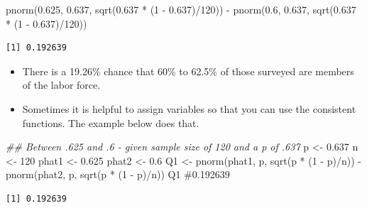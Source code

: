 \documentclass[
  letterpaper,
  DIV=11,
  numbers=noendperiod]{scrreprt}
\newenvironment{Shaded}{\begin{snugshade}}{\end{snugshade}}
\newcommand{\CommentTok}[1]{\textcolor[rgb]{0.37,0.37,0.37}{#1}}
\newcommand{\DecValTok}[1]{\textcolor[rgb]{0.68,0.00,0.00}{#1}}
\newcommand{\DocumentationTok}[1]{\textcolor[rgb]{0.37,0.37,0.37}{\textit{#1}}}
\newcommand{\FloatTok}[1]{\textcolor[rgb]{0.68,0.00,0.00}{#1}}
\newcommand{\FunctionTok}[1]{\textcolor[rgb]{0.28,0.35,0.67}{#1}}
\newcommand{\NormalTok}[1]{\textcolor[rgb]{0.00,0.23,0.31}{#1}}
\newcommand{\OtherTok}[1]{\textcolor[rgb]{0.00,0.23,0.31}{#1}}
\newcommand{\SpecialCharTok}[1]{\textcolor[rgb]{0.37,0.37,0.37}{#1}}
\begin{document}
\begin{Shaded}
\begin{Highlighting}[]
\FunctionTok{pnorm}\NormalTok{(}\FloatTok{0.625}\NormalTok{, }\FloatTok{0.637}\NormalTok{, }\FunctionTok{sqrt}\NormalTok{(}\FloatTok{0.637} \SpecialCharTok{*}\NormalTok{ (}\DecValTok{1} \SpecialCharTok{{-}} \FloatTok{0.637}\NormalTok{)}\SpecialCharTok{/}\DecValTok{120}\NormalTok{)) }\SpecialCharTok{{-}} \FunctionTok{pnorm}\NormalTok{(}\FloatTok{0.6}\NormalTok{, }\FloatTok{0.637}\NormalTok{,}
    \FunctionTok{sqrt}\NormalTok{(}\FloatTok{0.637} \SpecialCharTok{*}\NormalTok{ (}\DecValTok{1} \SpecialCharTok{{-}} \FloatTok{0.637}\NormalTok{)}\SpecialCharTok{/}\DecValTok{120}\NormalTok{))}
\end{Highlighting}
\end{Shaded}

\begin{verbatim}
[1] 0.192639
\end{verbatim}

\begin{itemize}
\item
  There is a 19.26\% chance that 60\% to 62.5\% of those surveyed are
  members of the labor force.
\item
  Sometimes it is helpful to assign variables so that you can use the
  consistent functions. The example below does that.
\end{itemize}

\begin{Shaded}
\begin{Highlighting}[]
\DocumentationTok{\#\# Between .625 and .6 {-} given sample size of 120 and a p of .637}
\NormalTok{p }\OtherTok{\textless{}{-}} \FloatTok{0.637}
\NormalTok{n }\OtherTok{\textless{}{-}} \DecValTok{120}
\NormalTok{phat1 }\OtherTok{\textless{}{-}} \FloatTok{0.625}
\NormalTok{phat2 }\OtherTok{\textless{}{-}} \FloatTok{0.6}
\NormalTok{Q1 }\OtherTok{\textless{}{-}} \FunctionTok{pnorm}\NormalTok{(phat1, p, }\FunctionTok{sqrt}\NormalTok{(p }\SpecialCharTok{*}\NormalTok{ (}\DecValTok{1} \SpecialCharTok{{-}}\NormalTok{ p)}\SpecialCharTok{/}\NormalTok{n)) }\SpecialCharTok{{-}} \FunctionTok{pnorm}\NormalTok{(phat2, p, }\FunctionTok{sqrt}\NormalTok{(p }\SpecialCharTok{*}\NormalTok{ (}\DecValTok{1} \SpecialCharTok{{-}}
\NormalTok{    p)}\SpecialCharTok{/}\NormalTok{n))}
\NormalTok{Q1  }\CommentTok{\#0.192639}
\end{Highlighting}
\end{Shaded}

\begin{verbatim}
[1] 0.192639
\end{verbatim}
\end{document}

